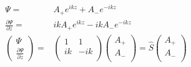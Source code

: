 			\begin{align}
				\Psi =& A_+ e^{ikz} + A_- e^{-ikz} \\
				\frac{\partial \Psi}{\partial z} =& ikA_+ e^{ikz} - ikA_- e^{-ikz} \\
				\begin{pmatrix}	
					\Psi \\
					\frac{\partial \Psi}{\partial z}
				\end{pmatrix} =& 
				\begin{pmatrix}
					1 & 1 \\
					ik & -ik \\
				\end{pmatrix}
				\begin{pmatrix}
					A_+ \\
					A_- \\
				\end{pmatrix} = \hat{S} 
				\begin{pmatrix}
					A_+ \\
					A_- \\
				\end{pmatrix}
			\end{align}
			
